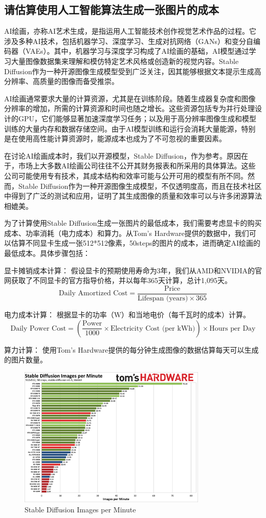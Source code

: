 \documentclass[a4paper,12pt]{ctexart} %
\begin{document}
	\subsection{请估算使用人工智能算法生成一张图片的成本}
	AI绘画，亦称AI艺术生成，是指运用人工智能技术创作视觉艺术作品的过程。它涉及多种AI技术，包括机器学习、深度学习、生成对抗网络（GANs）和变分自编码器（VAEs）。其中，机器学习与深度学习构成了AI绘画的基础，AI模型通过学习大量图像数据集来理解和模仿特定艺术风格或创造新的视觉内容。Stable Diffusion作为一种开源图像生成模型受到广泛关注，因其能够根据文本提示生成高分辨率、高质量的图像而备受推崇。

	AI绘画通常要求大量的计算资源，尤其是在训练阶段。随着生成器复杂度和图像分辨率的增加，所需的计算资源和时间也随之增长。这些资源包括专为并行处理设计的GPU，它们能够显著加速深度学习任务；以及用于高分辨率图像生成和模型训练的大量内存和数据存储空间。由于AI模型训练和运行会消耗大量能源，特别是在使用高性能计算资源时，能源成本也成为了不可忽视的重要因素。

	在讨论AI绘画成本时，我们以开源模型，Stable Diffusion，作为参考。原因在于，市场上大多数AI绘画公司往往不公开其财务报表和所采用的具体算法。这些公司可能使用专有技术，其成本结构和效率可能与公开可用的模型有所不同。然而，Stable Diffusion作为一种开源图像生成模型，不仅透明度高，而且在技术社区中得到了广泛的测试和应用，证明了其生成图像的质量和效率可以与许多闭源算法相媲美。

	为了计算使用Stable Diffusion生成一张图片的最低成本，我们需要考虑显卡的购买成本、功率消耗（电力成本）和算力。从Tom's Hardware提供的数据中，我们可以估算不同显卡生成一张512*512像素，50steps的图片的成本，进而确定AI绘画的最低成本。具体步骤包括：

	显卡摊销成本计算：
	假设显卡的预期使用寿命为3年，我们从AMD和NVIDIA的官网获取了不同显卡的官方指导价格，并以每年365天计算，总计1,095天。
\[
\text{Daily Amortized Cost} = \frac{\text{Price}}{\text{Lifespan (years)} \times 365}
\]

	电力成本计算：
	根据显卡的功率（W）和当地电价（每千瓦时的成本）计算。
\[
\text{Daily Power Cost} = \left(\frac{\text{Power}}{1000} \times \text{Electricity Cost (per kWh)}\right) \times \text{Hours per Day}
\]

算力计算：
使用Tom's Hardware提供的每分钟生成图像的数据估算每天可以生成的图片数量。
\begin{figure}[H]
\centering
\includegraphics[width=0.8\textwidth]{images_per_minute.png}
\caption{Stable Diffusion Images per Minute}
\label{fig:example}
\end{figure}
\end{document}
